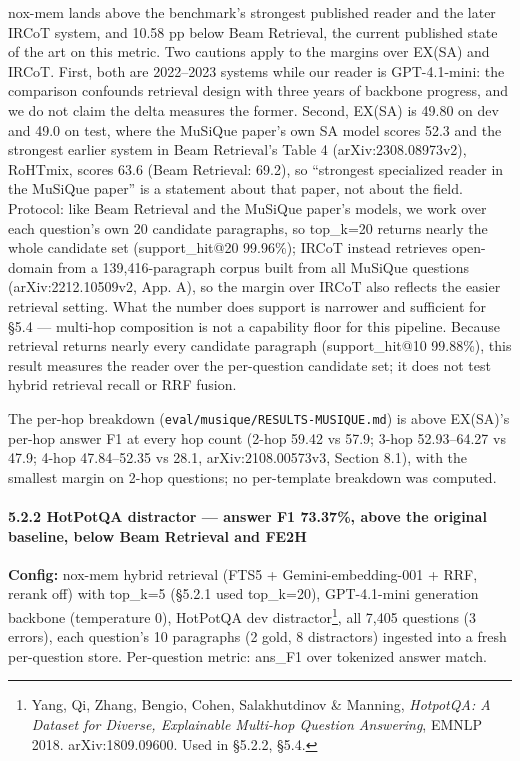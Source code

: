 \documentclass[
]{article}
\begin{document}
nox-mem lands above the benchmark's strongest published reader and the
later IRCoT system, and 10.58 pp below Beam Retrieval, the current
published state of the art on this metric. Two cautions apply to the
margins over EX(SA) and IRCoT. First, both are 2022--2023 systems while
our reader is GPT-4.1-mini: the comparison confounds retrieval design
with three years of backbone progress, and we do not claim the delta
measures the former. Second, EX(SA) is 49.80 on dev and 49.0 on test,
where the MuSiQue paper's own SA model scores 52.3 and the strongest
earlier system in Beam Retrieval's Table 4 (arXiv:2308.08973v2),
RoHTmix, scores 63.6 (Beam Retrieval: 69.2), so ``strongest specialized
reader in the MuSiQue paper'' is a statement about that paper, not about
the field. Protocol: like Beam Retrieval and the MuSiQue paper's models,
we work over each question's own 20 candidate paragraphs, so top\_k=20
returns nearly the whole candidate set (support\_hit@20 99.96\%); IRCoT
instead retrieves open-domain from a 139,416-paragraph corpus built from
all MuSiQue questions (arXiv:2212.10509v2, App. A), so the margin over
IRCoT also reflects the easier retrieval setting. What the number does
support is narrower and sufficient for §5.4 --- multi-hop composition is
not a capability floor for this pipeline. Because retrieval returns
nearly every candidate paragraph (support\_hit@10 99.88\%), this result
measures the reader over the per-question candidate set; it does not
test hybrid retrieval recall or RRF fusion.

The per-hop breakdown (\texttt{eval/musique/RESULTS-MUSIQUE.md}) is
above EX(SA)'s per-hop answer F1 at every hop count (2-hop 59.42 vs
57.9; 3-hop 52.93--64.27 vs 47.9; 4-hop 47.84--52.35 vs 28.1,
arXiv:2108.00573v3, Section 8.1), with the smallest margin on 2-hop
questions; no per-template breakdown was computed.

\paragraph{5.2.2 HotPotQA distractor --- answer F1 73.37\%, above the
original baseline, below Beam Retrieval and
FE2H}\label{hotpotqa-distractor-answer-f1-73.37-above-the-original-baseline-below-beam-retrieval-and-fe2h}

\textbf{Config:} nox-mem hybrid retrieval (FTS5 + Gemini-embedding-001 +
RRF, rerank off) with top\_k=5 (§5.2.1 used top\_k=20), GPT-4.1-mini
generation backbone (temperature 0), HotPotQA dev distractor\footnote{Yang,
  Qi, Zhang, Bengio, Cohen, Salakhutdinov \& Manning, \emph{HotpotQA: A
  Dataset for Diverse, Explainable Multi-hop Question Answering}, EMNLP
  2018. arXiv:1809.09600. Used in §5.2.2, §5.4.}, all 7,405 questions (3
errors), each question's 10 paragraphs (2 gold, 8 distractors) ingested
into a fresh per-question store. Per-question metric: ans\_F1 over
tokenized answer match.
\end{document}
